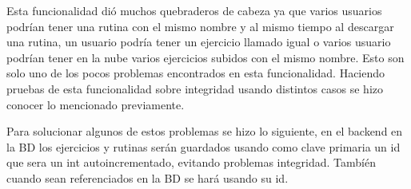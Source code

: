 
Esta funcionalidad dió muchos quebraderos de cabeza ya que varios usuarios podrían tener una rutina con el mismo nombre y al mismo tiempo al descargar una rutina, un usuario podría tener un ejercicio llamado igual o varios usuario podrían tener en la nube varios ejercicios subidos con el mismo nombre. Esto son solo uno de los pocos problemas encontrados en esta funcionalidad.
Haciendo pruebas de esta funcionalidad sobre integridad usando distintos casos se hizo conocer lo mencionado previamente.

Para solucionar algunos de estos problemas se hizo lo siguiente, en el backend en la BD los ejercicios y rutinas serán guardados usando como clave primaria un id que sera un int autoincrementado, evitando problemas integridad. Tambíén cuando sean referenciados en la BD se hará usando su id.


